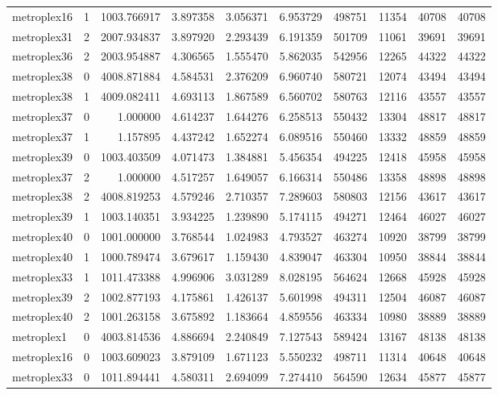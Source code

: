 \begin{longtable}{|l|r|r|r|r|r|r|r|r|r|}
metroplex16 & 1 & 1003.766917 & 3.897358 & 3.056371 & 6.953729 & 498751 & 11354 & 40708 & 40708 \\
metroplex31 & 2 & 2007.934837 & 3.897920 & 2.293439 & 6.191359 & 501709 & 11061 & 39691 & 39691 \\
metroplex36 & 2 & 2003.954887 & 4.306565 & 1.555470 & 5.862035 & 542956 & 12265 & 44322 & 44322 \\
metroplex38 & 0 & 4008.871884 & 4.584531 & 2.376209 & 6.960740 & 580721 & 12074 & 43494 & 43494 \\
metroplex38 & 1 & 4009.082411 & 4.693113 & 1.867589 & 6.560702 & 580763 & 12116 & 43557 & 43557 \\
metroplex37 & 0 & 1.000000 & 4.614237 & 1.644276 & 6.258513 & 550432 & 13304 & 48817 & 48817 \\
metroplex37 & 1 & 1.157895 & 4.437242 & 1.652274 & 6.089516 & 550460 & 13332 & 48859 & 48859 \\
metroplex39 & 0 & 1003.403509 & 4.071473 & 1.384881 & 5.456354 & 494225 & 12418 & 45958 & 45958 \\
metroplex37 & 2 & 1.000000 & 4.517257 & 1.649057 & 6.166314 & 550486 & 13358 & 48898 & 48898 \\
metroplex38 & 2 & 4008.819253 & 4.579246 & 2.710357 & 7.289603 & 580803 & 12156 & 43617 & 43617 \\
metroplex39 & 1 & 1003.140351 & 3.934225 & 1.239890 & 5.174115 & 494271 & 12464 & 46027 & 46027 \\
metroplex40 & 0 & 1001.000000 & 3.768544 & 1.024983 & 4.793527 & 463274 & 10920 & 38799 & 38799 \\
metroplex40 & 1 & 1000.789474 & 3.679617 & 1.159430 & 4.839047 & 463304 & 10950 & 38844 & 38844 \\
metroplex33 & 1 & 1011.473388 & 4.996906 & 3.031289 & 8.028195 & 564624 & 12668 & 45928 & 45928 \\
metroplex39 & 2 & 1002.877193 & 4.175861 & 1.426137 & 5.601998 & 494311 & 12504 & 46087 & 46087 \\
metroplex40 & 2 & 1001.263158 & 3.675892 & 1.183664 & 4.859556 & 463334 & 10980 & 38889 & 38889 \\
metroplex1 & 0 & 4003.814536 & 4.886694 & 2.240849 & 7.127543 & 589424 & 13167 & 48138 & 48138 \\
metroplex16 & 0 & 1003.609023 & 3.879109 & 1.671123 & 5.550232 & 498711 & 11314 & 40648 & 40648 \\
metroplex33 & 0 & 1011.894441 & 4.580311 & 2.694099 & 7.274410 & 564590 & 12634 & 45877 & 45877 \\

\end{longtable}
